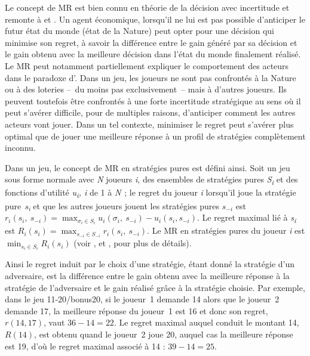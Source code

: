 \begin{Article}
\begin{refsection}[UmbhauerFR]
Le concept de MR est bien connu en théorie de la décision avec
incertitude et remonte à \textcite{savage1951} et \textcite{niehans1948}. Un
agent économique, lorsqu'il ne lui est pas possible d'anticiper le futur
état du monde (état de la Nature) peut opter pour une décision qui
minimise son regret, à savoir la différence entre le gain généré par sa
décision et le gain obtenu avec la meilleure décision dans l'état du
monde finalement réalisé. Le MR peut notamment partiellement expliquer
le comportement des acteurs dans le paradoxe d'\textcite{ellsberg1961}. Dans
un jeu, les joueurs ne sont pas confrontés à la Nature ou à des loteries
--~du moins pas exclusivement~-- mais à d'autres joueurs. Ils peuvent
toutefois être confrontés à une forte incertitude stratégique au sens où
il peut s'avérer difficile, pour de multiples raisons, d'anticiper
comment les autres acteurs vont jouer. Dans un tel contexte, minimiser
le regret peut s'avérer plus optimal que de jouer une meilleure réponse
à un profil de stratégies complètement inconnu.

Dans un jeu, le concept de MR en stratégies pures est défini ainsi. Soit
un jeu sous forme normale avec \emph{N} joueurs \emph{i}, des ensembles
de stratégies pures \emph{S\textsubscript{i}} et des fonctions d'utilité
\emph{u\textsubscript{i}, i} de 1 à \emph{N\textsubscript{~}}; le regret
du joueur \emph{i} lorsqu'il joue la stratégie pure\({\ \ s}_{i}\ \)et
que les autres joueurs jouent les stratégies pures
$s_{-i}$ est
\(r_{i}(s_{i},~s_{-i}) = \max_{\sigma_{i} \in S_{i}}{u_{i}\left( \sigma_{i},~s_{-i} \right) - u_{i}\left( s_{i},s_{- i} \right)}\).
Le regret maximal lié à \emph{s\textsubscript{i}} est\linebreak
\(R_{i}\left( s_{i} \right) = \max_{s_{-i} \in S_{-i}}{r_{i}(s_{i},~s_{-i})}\).
Le MR en stratégies pures du joueur \emph{i} est\linebreak
\(\min_{s_{i} \in S_{i}}{R_{i}\left( s_{i} \right)}\) (voir \textcite{linhart1989}, \textcite{renou2010} et \textcite{halpern2012}, pour plus de détails).

Ainsi le regret induit par le choix d'une stratégie, étant donné la
stratégie d'un adversaire, est la différence entre le gain obtenu avec
la meilleure réponse à la stratégie de l'adversaire et le gain réalisé
grâce à la stratégie choisie. Par exemple, dans le jeu 11-20/bonus20, si
le joueur~1 demande 14 alors que le joueur~2 demande 17, la meilleure
réponse du joueur~1 est 16 et donc son regret, $r(14, 17)$, vaut
$36-14=22$. Le regret maximal auquel conduit le montant 14, $R(14)$,
est obtenu quand le joueur~2 joue 20, auquel cas la meilleure réponse
est 19, d'où le regret maximal associé à 14 : $39-14=25$.


\end{refsection}
\end{Article}
